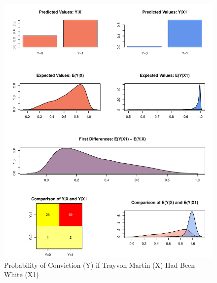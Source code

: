 \documentclass[12pt,article]{article}
\begin{document}
\begin{figure}[htbp]
\centering
\includegraphics{stand_your_ground_article_files/figure-latex/unnamed-chunk-8-1.pdf}
\caption{Probability of Conviction (Y) if Trayvon Martin (X) Had Been
White (X1)}
\end{figure}
\end{document}
